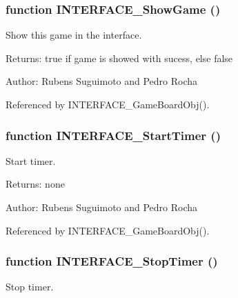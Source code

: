 \subsubsection[INTERFACE\_\-ShowGame]{\setlength{\rightskip}{0pt plus 5cm}function INTERFACE\_\-ShowGame ()}\label{interface_2game_8js_69dab02dda522a333884651d305decfa}


Show this game in the interface. 

\begin{Desc}
\item[Returns:]true if game is showed with sucess, else false \end{Desc}
\begin{Desc}
\item[Author:]Rubens Suguimoto and Pedro Rocha \end{Desc}


Referenced by INTERFACE\_\-GameBoardObj().
\subsubsection[INTERFACE\_\-StartTimer]{\setlength{\rightskip}{0pt plus 5cm}function INTERFACE\_\-StartTimer ()}\label{interface_2game_8js_bf8fbf5f0c9b86c903f06b288998ea12}


Start timer. 

\begin{Desc}
\item[Returns:]none \end{Desc}
\begin{Desc}
\item[Author:]Rubens Suguimoto and Pedro Rocha \end{Desc}


Referenced by INTERFACE\_\-GameBoardObj().
\subsubsection[INTERFACE\_\-StopTimer]{\setlength{\rightskip}{0pt plus 5cm}function INTERFACE\_\-StopTimer ()}\label{interface_2game_8js_d5e647125534a1da08c2d990cb60db7f}


Stop timer. 

